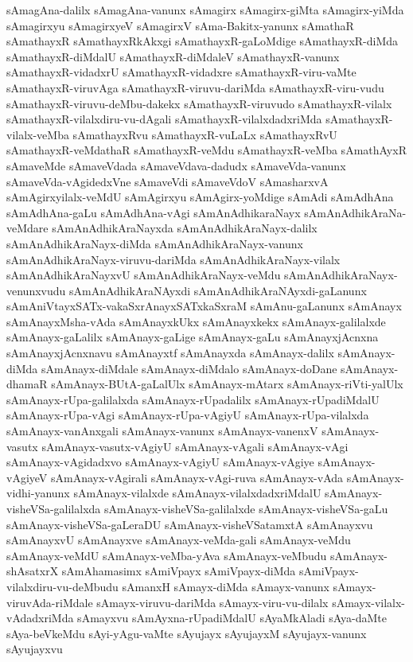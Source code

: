 {sAmagAna-dalilx
sAmagAna-vanunx
sAmagirx
sAmagirx-giMta
sAmagirx-yiMda
sAmagirxyu
sAmagirxyeV
sAmagirxV
sAma-Bakitx-yanunx
sAmathaR
sAmathayxR
sAmathayxRkAkxgi
sAmathayxR-gaLoMdige
sAmathayxR-diMda
sAmathayxR-diMdalU
sAmathayxR-diMdaleV
sAmathayxR-vanunx
sAmathayxR-vidadxrU
sAmathayxR-vidadxre
sAmathayxR-viru-vaMte
sAmathayxR-viruvAga
sAmathayxR-viruvu-dariMda
sAmathayxR-viru-vudu
sAmathayxR-viruvu-deMbu-dakekx
sAmathayxR-viruvudo
sAmathayxR-vilalx
sAmathayxR-vilalxdiru-vu-dAgali
sAmathayxR-vilalxdadxriMda
sAmathayxR-vilalx-veMba
sAmathayxRvu
sAmathayxR-vuLaLx
sAmathayxRvU
sAmathayxR-veMdathaR
sAmathayxR-veMdu
sAmathayxR-veMba
sAmathAyxR
sAmaveMde
sAmaveVdada
sAmaveVdava-dadudx
sAmaveVda-vanunx
sAmaveVda-vAgidedxVne
sAmaveVdi
sAmaveVdoV
sAmasharxvA
sAmAgirxyilalx-veMdU
sAmAgirxyu
sAmAgirx-yoMdige
sAmAdi
sAmAdhAna
sAmAdhAna-gaLu
sAmAdhAna-vAgi
sAmAnAdhikaraNayx
sAmAnAdhikAraNa-veMdare
sAmAnAdhikAraNayxda
sAmAnAdhikAraNayx-dalilx
sAmAnAdhikAraNayx-diMda
sAmAnAdhikAraNayx-vanunx
sAmAnAdhikAraNayx-viruvu-dariMda
sAmAnAdhikAraNayx-vilalx
sAmAnAdhikAraNayxvU
sAmAnAdhikAraNayx-veMdu
sAmAnAdhikAraNayx-venunxvudu
sAmAnAdhikAraNAyxdi
sAmAnAdhikAraNAyxdi-gaLanunx
sAmAniVtayxSATx-vakaSxrAnayxSATxkaSxraM
sAmAnu-gaLanunx
sAmAnayx
sAmAnayxMsha-vAda
sAmAnayxkUkx
sAmAnayxkekx
sAmAnayx-galilalxde
sAmAnayx-gaLalilx
sAmAnayx-gaLige
sAmAnayx-gaLu
sAmAnayxjAcnxna
sAmAnayxjAcnxnavu
sAmAnayxtf
sAmAnayxda
sAmAnayx-dalilx
sAmAnayx-diMda
sAmAnayx-diMdale
sAmAnayx-diMdalo
sAmAnayx-doDane
sAmAnayx-dhamaR
sAmAnayx-BUtA-gaLalUlx
sAmAnayx-mAtarx
sAmAnayx-riVti-yalUlx
sAmAnayx-rUpa-galilalxda
sAmAnayx-rUpadalilx
sAmAnayx-rUpadiMdalU
sAmAnayx-rUpa-vAgi
sAmAnayx-rUpa-vAgiyU
sAmAnayx-rUpa-vilalxda
sAmAnayx-vanAnxgali
sAmAnayx-vanunx
sAmAnayx-vanenxV
sAmAnayx-vasutx
sAmAnayx-vasutx-vAgiyU
sAmAnayx-vAgali
sAmAnayx-vAgi
sAmAnayx-vAgidadxvo
sAmAnayx-vAgiyU
sAmAnayx-vAgiye
sAmAnayx-vAgiyeV
sAmAnayx-vAgirali
sAmAnayx-vAgi-ruva
sAmAnayx-vAda
sAmAnayx-vidhi-yanunx
sAmAnayx-vilalxde
sAmAnayx-vilalxdadxriMdalU
sAmAnayx-visheVSa-galilalxda
sAmAnayx-visheVSa-galilalxde
sAmAnayx-visheVSa-gaLu
sAmAnayx-visheVSa-gaLeraDU
sAmAnayx-visheVSatamxtA
sAmAnayxvu
sAmAnayxvU
sAmAnayxve
sAmAnayx-veMda-gali
sAmAnayx-veMdu
sAmAnayx-veMdU
sAmAnayx-veMba-yAva
sAmAnayx-veMbudu
sAmAnayx-shAsatxrX
sAmAhamasimx
sAmiVpayx
sAmiVpayx-diMda
sAmiVpayx-vilalxdiru-vu-deMbudu
sAmanxH
sAmayx-diMda
sAmayx-vanunx
sAmayx-viruvAda-riMdale
sAmayx-viruvu-dariMda
sAmayx-viru-vu-dilalx
sAmayx-vilalx-vAdadxriMda
sAmayxvu
sAmAyxna-rUpadiMdalU
sAyaMkAladi
sAya-daMte
sAya-beVkeMdu
sAyi-yAgu-vaMte
sAyujayx
sAyujayxM
sAyujayx-vanunx
sAyujayxvu
}
